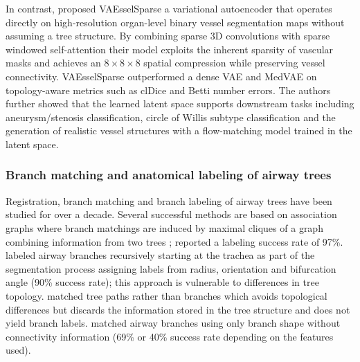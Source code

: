 In contrast, \citet{prabhakar2026vaesselsparse} proposed VAEsselSparse a variational
autoencoder that operates directly on high-resolution organ-level binary vessel segmentation
maps without assuming a tree structure. By combining sparse 3D convolutions with sparse
windowed self-attention their model exploits the inherent sparsity of vascular masks and
achieves an $8\times8\times8$ spatial compression while preserving vessel connectivity.
VAEsselSparse outperformed a dense VAE and MedVAE on topology-aware metrics such as clDice and
Betti number errors. The authors further showed that the learned latent space supports
downstream tasks including aneurysm/stenosis classification, circle of Willis subtype
classification and the generation of realistic vessel structures with a flow-matching model
trained in the latent space.

\subsubsection{Branch matching and anatomical labeling of airway trees}  %
\label{sec:related_labeling}             %

Registration, branch matching and branch labeling of airway trees have been studied for over
a decade. Several successful methods are based on association graphs where branch matchings
are induced by maximal cliques of a graph combining information from two trees
\cite{kitaoka2002automated,tschirren2005matching,metzen2009matching};
\citet{tschirren2005matching} reported a labeling success rate of 97\%.
\citet{vanginneken2008robust} labeled airway branches recursively starting at the trachea
as part of the segmentation process assigning labels from radius, orientation and
bifurcation angle (90\% success rate); this approach is vulnerable to differences in tree
topology. \citet{kaftan2006novel} matched tree paths rather than branches which avoids
topological differences but discards the information stored in the tree structure and does
not yield branch labels. \citet{bulow2006point} matched airway branches using only branch
shape without connectivity information (69\% or 40\% success rate depending on the features
used).


